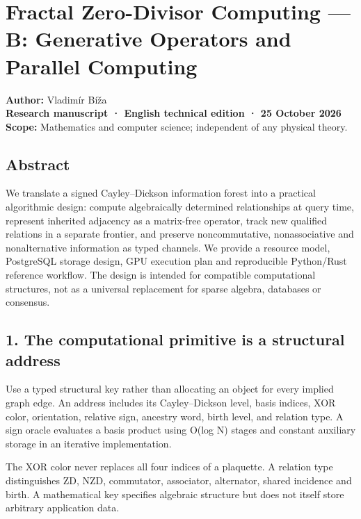 \documentclass[
  10pt,
]{article}
\author{}
\date{}
\begin{document}
{
\setcounter{tocdepth}{3}
\tableofcontents
}
\section{Fractal Zero-Divisor Computing --- B: Generative Operators and
Parallel
Computing}\label{fractal-zero-divisor-computing-b-generative-operators-and-parallel-computing}

\textbf{Author:} Vladimír Bíža\\
\textbf{Research manuscript · English technical edition · 25 October
2026}\\
\textbf{Scope:} Mathematics and computer science; independent of any
physical theory.

\subsection{Abstract}\label{abstract}

We translate a signed Cayley--Dickson information forest into a
practical algorithmic design: compute algebraically determined
relationships at query time, represent inherited adjacency as a
matrix-free operator, track new qualified relations in a separate
frontier, and preserve noncommutative, nonassociative and nonalternative
information as typed channels. We provide a resource model, PostgreSQL
storage design, GPU execution plan and reproducible Python/Rust
reference workflow. The design is intended for compatible computational
structures, not as a universal replacement for sparse algebra, databases
or consensus.

\subsection{1. The computational primitive is a structural
address}\label{the-computational-primitive-is-a-structural-address}

Use a typed structural key rather than allocating an object for every
implied graph edge. An address includes its Cayley--Dickson level, basis
indices, XOR color, orientation, relative sign, ancestry word, birth
level, and relation type. A sign oracle evaluates a basis product using
O(log N) stages and constant auxiliary storage in an iterative
implementation.

The XOR color never replaces all four indices of a plaquette. A relation
type distinguishes ZD, NZD, commutator, associator, alternator, shared
incidence and birth. A mathematical key specifies algebraic structure
but does not itself store arbitrary application data.
\end{document}
